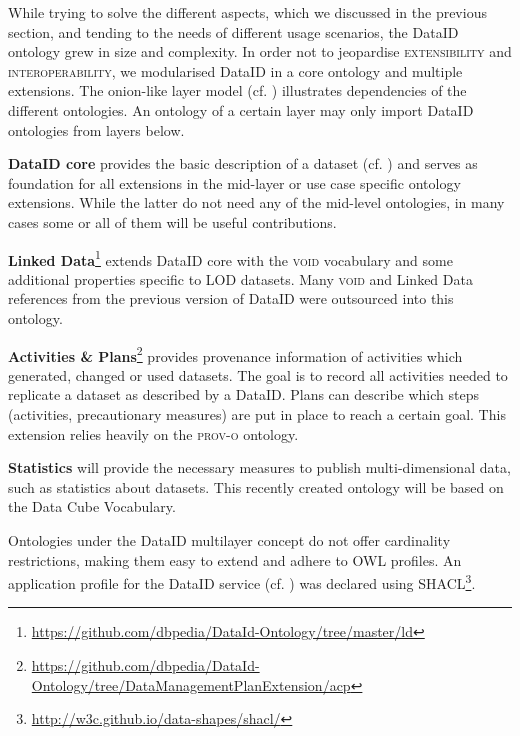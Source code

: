 \documentclass[runningheads,a4paper]{llncs}
\newcommand{\extensibility}{{\scshape extensibility}\xspace}
\newcommand{\interoperability}{{\scshape interoperability}\xspace}
\newcommand{\prov}{{\scshape prov-o}\xspace}
\newcommand{\void}{{\scshape void}\xspace}
\newcommand\footnoteurl[1]{\footnote{\scriptsize\url{#1}}}
\begin{document}
While trying to solve the different aspects, which we discussed in the previous section, and tending to the needs of different usage scenarios, the DataID ontology grew in size and complexity.
In order not to jeopardise \extensibility and \interoperability, we modularised DataID in a core ontology and multiple extensions. The onion-like layer model (cf. ) illustrates dependencies of the different ontologies. An ontology of a certain layer may only import DataID ontologies from layers below.

\textbf{DataID core} provides the basic description of a dataset (cf. ) and serves as foundation for all extensions in the mid-layer or use case specific ontology extensions.
While the latter do not need any of the mid-level ontologies, in many cases some or all of them will be useful contributions.

\textbf{Linked Data}\footnoteurl{https://github.com/dbpedia/DataId-Ontology/tree/master/ld} extends DataID core with the \void vocabulary\cite{void} and some additional properties specific to LOD datasets. Many \void and Linked Data references from the previous version of DataID were outsourced into this ontology.

\textbf{Activities \& Plans}\footnoteurl{https://github.com/dbpedia/DataId-Ontology/tree/DataManagementPlanExtension/acp} provides provenance information of activities which generated, changed or used datasets. The goal is to record all activities needed to replicate a dataset as described by a DataID. Plans can describe which steps (activities, precautionary measures) are put in place to reach a certain goal. This extension relies heavily on the \prov ontology\cite{prov}.

\textbf{Statistics} will provide the necessary measures to publish multi-dimensional data, such as statistics about datasets. This recently created ontology will be based on the Data Cube Vocabulary\cite{datacube}.

Ontologies under the DataID multilayer concept do not offer cardinality restrictions, making them easy to extend and adhere to OWL profiles. An application profile for the DataID service (cf. ) was declared using SHACL\footnoteurl{http://w3c.github.io/data-shapes/shacl/}.
\end{document}
